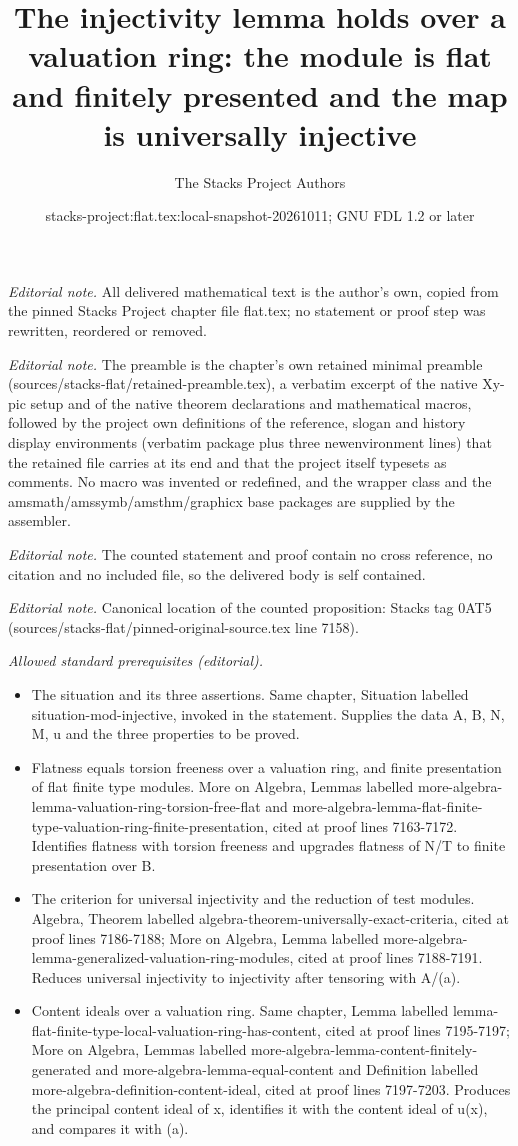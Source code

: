 \documentclass[10pt,a4paper]{amsart}
\title{The injectivity lemma holds over a valuation ring: the module is flat and finitely presented and the map is universally injective}
\author{The Stacks Project Authors}
\date{stacks-project:flat.tex:local-snapshot-20261011; GNU FDL 1.2 or later}
\theoremstyle{plain}
\theoremstyle{definition}
\theoremstyle{remark}
\numberwithin{equation}{subsection}
\begin{document}
\maketitle
\noindent\textit{Editorial note.} All delivered mathematical text is the author's own, copied from the pinned Stacks Project chapter file flat.tex; no statement or proof step was rewritten, reordered or removed.\par\medskip
\noindent\textit{Editorial note.} The preamble is the chapter's own retained minimal preamble (sources/stacks-flat/retained-preamble.tex), a verbatim excerpt of the native Xy-pic setup and of the native theorem declarations and mathematical macros, followed by the project own definitions of the reference, slogan and history display environments (verbatim package plus three newenvironment lines) that the retained file carries at its end and that the project itself typesets as comments. No macro was invented or redefined, and the wrapper class and the amsmath/amssymb/amsthm/graphicx base packages are supplied by the assembler.\par\medskip
\noindent\textit{Editorial note.} The counted statement and proof contain no cross reference, no citation and no included file, so the delivered body is self contained.\par\medskip
\noindent\textit{Editorial note.} Canonical location of the counted proposition: Stacks tag 0AT5 (sources/stacks-flat/pinned-original-source.tex line 7158).\par\medskip
\noindent\textit{Allowed standard prerequisites (editorial).}\begin{itemize}
\item The situation and its three assertions. Same chapter, Situation labelled situation-mod-injective, invoked in the statement. Supplies the data A, B, N, M, u and the three properties to be proved.
\item Flatness equals torsion freeness over a valuation ring, and finite presentation of flat finite type modules. More on Algebra, Lemmas labelled more-algebra-lemma-valuation-ring-torsion-free-flat and more-algebra-lemma-flat-finite-type-valuation-ring-finite-presentation, cited at proof lines 7163-7172. Identifies flatness with torsion freeness and upgrades flatness of N/T to finite presentation over B.
\item The criterion for universal injectivity and the reduction of test modules. Algebra, Theorem labelled algebra-theorem-universally-exact-criteria, cited at proof lines 7186-7188; More on Algebra, Lemma labelled more-algebra-lemma-generalized-valuation-ring-modules, cited at proof lines 7188-7191. Reduces universal injectivity to injectivity after tensoring with A/(a).
\item Content ideals over a valuation ring. Same chapter, Lemma labelled lemma-flat-finite-type-local-valuation-ring-has-content, cited at proof lines 7195-7197; More on Algebra, Lemmas labelled more-algebra-lemma-content-finitely-generated and more-algebra-lemma-equal-content and Definition labelled more-algebra-definition-content-ideal, cited at proof lines 7197-7203. Produces the principal content ideal of x, identifies it with the content ideal of u(x), and compares it with (a).
\end{itemize}\medskip
\end{document}
